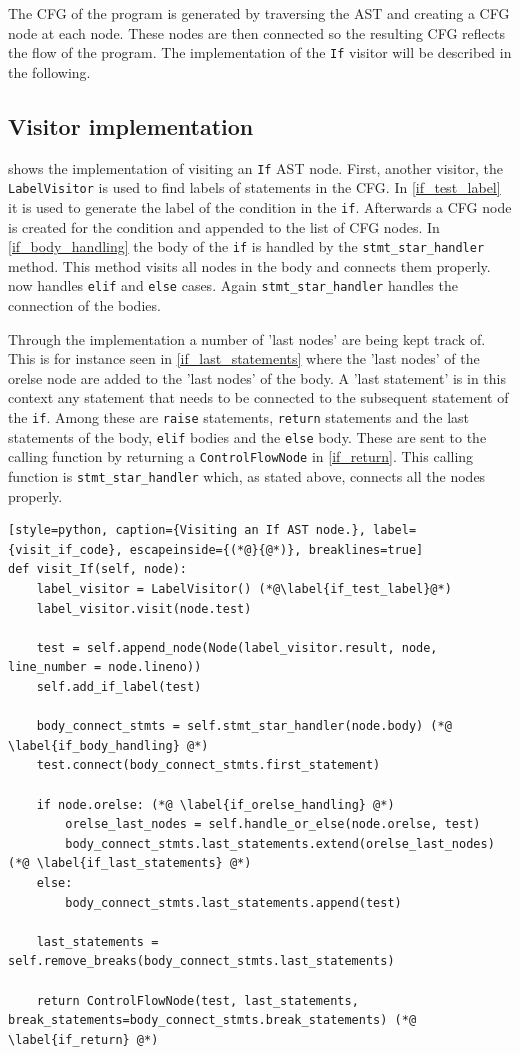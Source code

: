 The CFG of the program is generated by traversing the AST and creating a CFG node at each node.
These nodes are then connected so the resulting CFG reflects the flow of the program.
The implementation of the \texttt{If} visitor will be described in the following.

\subsection{Visitor implementation}\label{cfg:visitor}
 shows the implementation of visiting an \texttt{If} AST node.
First, another visitor, the \texttt{LabelVisitor} is used to find labels of statements in the CFG.
In \cref{if_test_label} it is used to generate the label of the condition in the \texttt{if}.
Afterwards a CFG node is created for the condition and appended to the list of CFG nodes.
In \cref{if_body_handling} the body of the \texttt{if} is handled by the \texttt{stmt\_star\_handler} method.
This method visits all nodes in the body and connects them properly.
 now handles \texttt{elif} and \texttt{else} cases.
Again \texttt{stmt\_star\_handler} handles the connection of the bodies.

Through the implementation a number of 'last nodes' are being kept track of.
This is for instance seen in \cref{if_last_statements} where the 'last nodes' of the orelse node are added to the 'last nodes' of the body.
A 'last statement' is in this context any statement that needs to be connected to the subsequent statement of the \texttt{if}.
Among these are \texttt{raise} statements, \texttt{return} statements and the last statements of the body, \texttt{elif} bodies and the \texttt{else} body. 
These are sent to the calling function by returning a \texttt{ControlFlowNode} in \cref{if_return}.
This calling function is \texttt{stmt\_star\_handler} which, as stated above, connects all the nodes properly.

\begin{lstlisting}[style=python, caption={Visiting an If AST node.}, label={visit_if_code}, escapeinside={(*@}{@*)}, breaklines=true]
def visit_If(self, node):
    label_visitor = LabelVisitor() (*@\label{if_test_label}@*)
    label_visitor.visit(node.test)

    test = self.append_node(Node(label_visitor.result, node, line_number = node.lineno))
    self.add_if_label(test)

    body_connect_stmts = self.stmt_star_handler(node.body) (*@ \label{if_body_handling} @*)
    test.connect(body_connect_stmts.first_statement)
        
    if node.orelse: (*@ \label{if_orelse_handling} @*)
        orelse_last_nodes = self.handle_or_else(node.orelse, test)
        body_connect_stmts.last_statements.extend(orelse_last_nodes) (*@ \label{if_last_statements} @*)
    else:
        body_connect_stmts.last_statements.append(test)

    last_statements = self.remove_breaks(body_connect_stmts.last_statements)

    return ControlFlowNode(test, last_statements, break_statements=body_connect_stmts.break_statements) (*@ \label{if_return} @*)
\end{lstlisting}
